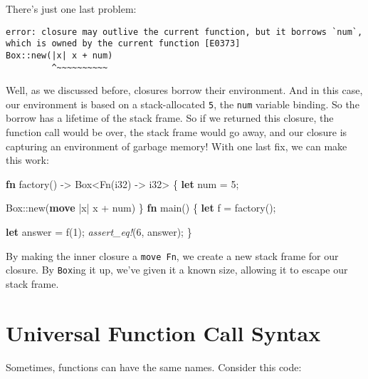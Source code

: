 \documentclass[a4paper,]{book}
\renewcommand*{\hypertarget}[3][\ar]{%
  \def\ar{#2}%
  \label{#1}%
  #3}
\newenvironment{Shaded}{\begin{snugshade}}{\end{snugshade}}
\newcommand{\KeywordTok}[1]{\textcolor[rgb]{0.13,0.29,0.53}{\textbf{{#1}}}}
\newcommand{\DataTypeTok}[1]{\textcolor[rgb]{0.13,0.29,0.53}{{#1}}}
\newcommand{\DecValTok}[1]{\textcolor[rgb]{0.00,0.00,0.81}{{#1}}}
\newcommand{\BuiltInTok}[1]{{#1}}
\newcommand{\PreprocessorTok}[1]{\textcolor[rgb]{0.56,0.35,0.01}{\textit{{#1}}}}
\newcommand{\NormalTok}[1]{{#1}}
\begin{document}
There's just one last problem:

\begin{verbatim}
error: closure may outlive the current function, but it borrows `num`,
which is owned by the current function [E0373]
Box::new(|x| x + num)
         ^~~~~~~~~~~
\end{verbatim}

Well, as we discussed before, closures borrow their environment. And in
this case, our environment is based on a stack-allocated \texttt{5}, the
\texttt{num} variable binding. So the borrow has a lifetime of the stack
frame. So if we returned this closure, the function call would be over,
the stack frame would go away, and our closure is capturing an
environment of garbage memory! With one last fix, we can make this work:

\begin{Shaded}
\begin{Highlighting}[]
\KeywordTok{fn} \NormalTok{factory() -> }\DataTypeTok{Box}\NormalTok{<}\BuiltInTok{Fn}\NormalTok{(}\DataTypeTok{i32}\NormalTok{) -> }\DataTypeTok{i32}\NormalTok{> \{}
    \KeywordTok{let} \NormalTok{num = }\DecValTok{5}\NormalTok{;}

    \DataTypeTok{Box}\NormalTok{::new(}\KeywordTok{move} \NormalTok{|x| x + num)}
\NormalTok{\}}
\KeywordTok{fn} \NormalTok{main() \{}
\KeywordTok{let} \NormalTok{f = factory();}

\KeywordTok{let} \NormalTok{answer = f(}\DecValTok{1}\NormalTok{);}
\PreprocessorTok{assert_eq!}\NormalTok{(}\DecValTok{6}\NormalTok{, answer);}
\NormalTok{\}}
\end{Highlighting}
\end{Shaded}

By making the inner closure a \texttt{move\ Fn}, we create a new stack
frame for our closure. By \texttt{Box}ing it up, we've given it a known
size, allowing it to escape our stack frame.

\hypertarget{sec--ufcs}{\section{Universal Function Call
Syntax}\label{sec--ufcs}}

Sometimes, functions can have the same names. Consider this code:
\end{document}
